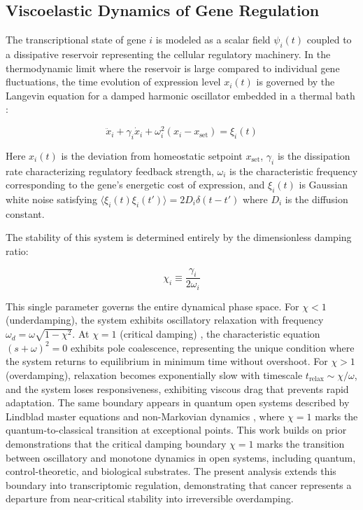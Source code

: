 \documentclass[11pt,letterpaper]{article}
\begin{document}
\subsection{Viscoelastic Dynamics of Gene Regulation}

The transcriptional state of gene $i$ is modeled as a scalar field $\psi_i(t)$ coupled to a dissipative reservoir representing the cellular regulatory machinery. In the thermodynamic limit where the reservoir is large compared to individual gene fluctuations, the time evolution of expression level $x_i(t)$ is governed by the Langevin equation for a damped harmonic oscillator embedded in a thermal bath \cite{VanKampen2007}:

\begin{equation}
\ddot{x}_i + \gamma_i \dot{x}_i + \omega_i^2 (x_i - x_{\text{set}}) = \xi_i(t)
\label{eq:langevin}
\end{equation}

Here $x_i(t)$ is the deviation from homeostatic setpoint $x_{\text{set}}$, $\gamma_i$ is the dissipation rate characterizing regulatory feedback strength, $\omega_i$ is the characteristic frequency corresponding to the gene's energetic cost of expression, and $\xi_i(t)$ is Gaussian white noise satisfying $\langle \xi_i(t) \xi_i(t') \rangle = 2D_i \delta(t-t')$ where $D_i$ is the diffusion constant.

The stability of this system is determined entirely by the dimensionless damping ratio:

\begin{equation}
\chi_i \equiv \frac{\gamma_i}{2\omega_i}
\label{eq:chi_definition}
\end{equation}

This single parameter governs the entire dynamical phase space. For $\chi < 1$ (underdamping), the system exhibits oscillatory relaxation with frequency $\omega_d = \omega\sqrt{1-\chi^2}$. At $\chi = 1$ (critical damping) \cite{Ogata2010}, the characteristic equation $(s + \omega)^2 = 0$ exhibits pole coalescence, representing the unique condition where the system returns to equilibrium in minimum time without overshoot. For $\chi > 1$ (overdamping), relaxation becomes exponentially slow with timescale $t_{\text{relax}} \sim \chi/\omega$, and the system loses responsiveness, exhibiting viscous drag that prevents rapid adaptation. The same boundary appears in quantum open systems described by Lindblad master equations \cite{Lindblad1976} and non-Markovian dynamics \cite{Breuer2002}, where $\chi = 1$ marks the quantum-to-classical transition at exceptional points. This work builds on prior demonstrations \cite{Christensen2025Gaps} that the critical damping boundary $\chi = 1$ marks the transition between oscillatory and monotone dynamics in open systems, including quantum, control-theoretic, and biological substrates. The present analysis extends this boundary into transcriptomic regulation, demonstrating that cancer represents a departure from near-critical stability into irreversible overdamping.
\end{document}
